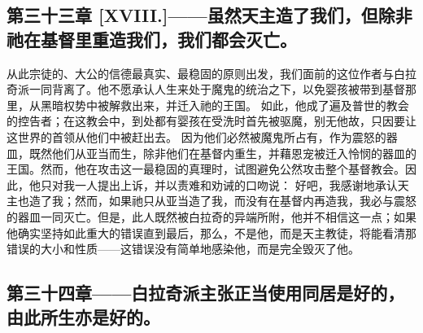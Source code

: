 
\subsection{第三十三章 [XVIII.]——虽然天主造了我们，但除非祂在基督里重造我们，我们都会灭亡。}

从此宗徒的、大公的信德最真实、最稳固的原则出发，我们面前的这位作者与白拉奇派一同背离了。他不愿承认人生来处于魔鬼的统治之下，以免婴孩被带到基督那里，从黑暗权势中被解救出来，并迁入祂的王国。 如此，他成了遍及普世的教会的控告者；在这教会中，到处都有婴孩在受洗时首先被驱魔，别无他故，只因要让这世界的首领从他们中被赶出去。 因为他们必然被魔鬼所占有，作为震怒的器皿，既然他们从亚当而生，除非他们在基督内重生，并藉恩宠被迁入怜悯的器皿的王国。然而，他在攻击这一最稳固的真理时，试图避免公然攻击整个基督教会。因此，他只对我一人提出上诉，并以责难和劝诫的口吻说： 好吧，我感谢地承认天主也造了我；然而，如果祂只从亚当造了我，而没有在基督内再造我，我必与震怒的器皿一同灭亡。但是，此人既然被白拉奇的异端所附，他并不相信这一点；如果他确实坚持如此重大的错误直到最后，那么，不是他，而是天主教徒，将能看清那错误的大小和性质——这错误没有简单地感染他，而是完全毁灭了他。\par


\subsection{第三十四章——白拉奇派主张正当使用同居是好的，由此所生亦是好的。}

